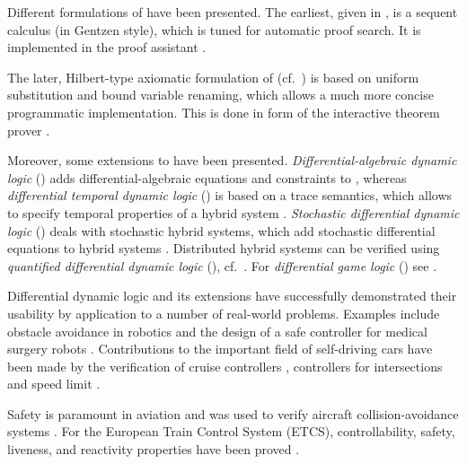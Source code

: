     Different formulations of \dL have been presented.
    The earliest, given in \cite{Platzer10HybridSystems}, is a sequent calculus (in Gentzen style), which is tuned for automatic proof search. It is implemented in the proof assistant \KeYmaera.

    The later, Hilbert-type axiomatic formulation of \dL (cf.~\cite{Platzer15Uniform,Platzer12Complete,Platzer12LogicsDynSys}) is based on uniform substitution and bound variable renaming, which allows a much more concise programmatic implementation. This is done in form of the interactive theorem prover \KeYmaeraX.

    Moreover, some extensions to \dL have been presented.
    \emph{Differential-algebraic dynamic logic} (\DAL) adds differential-algebraic equations and constraints to \dL \cite{Platzer10DAL}, whereas
    \emph{differential temporal dynamic logic} (\dTL) is based on a trace semantics, which allows to specify temporal properties of a hybrid system \cite{Platzer07dTL}.
    \emph{Stochastic differential dynamic logic} (\SdL) deals with stochastic hybrid systems, which add stochastic differential equations to hybrid systems \cite{Platzer11StochasticHP}.
    Distributed hybrid systems can be verified using \emph{quantified differential dynamic logic} (\QdL), cf.~\cite{Platzer10QdL}.
    For \emph{differential game logic} (\dGL) see \cite{Platzer15GameLogic}.
    
    Differential dynamic logic and its extensions have successfully demonstrated their usability by application to a number of real-world problems.
    Examples include obstacle avoidance in robotics \cite{Mitsch16Robots} and the design of a safe controller for medical surgery robots \cite{Kouskoulas13SurgicalRobot}.
    Contributions to the important field of self-driving cars have been made by the verification of cruise controllers \cite{Loos11CruiseControl,Loos13CruiseControllers}, controllers for intersections \cite{Loos11Intersections} and speed limit \cite{Mitsch12SpeedControl}.
    
    Safety is paramount in aviation \cite{GhorbalAerospace} and \KeYmaera was used to verify aircraft collision-avoidance systems \cite{Jeannin15ACASX,Jeannin15CollisonAvoidance,Loos13Aircraft}.
    For the European Train Control System (ETCS), controllability, safety, liveness, and reactivity properties have been proved \cite{Platzer09ETCS}.

